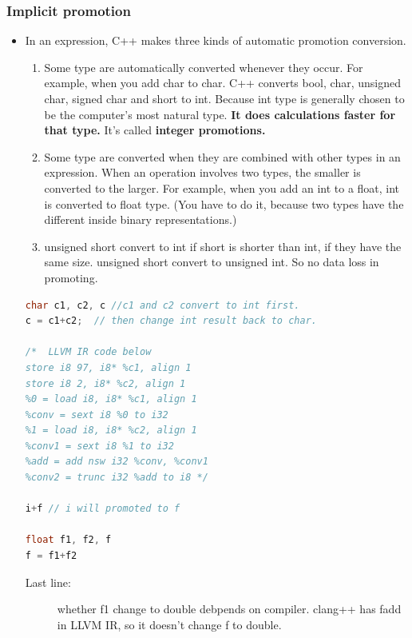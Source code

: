 \documentclass[a4paper,11pt,twoside]{book}
\begin{document}
\subsubsection{Implicit promotion}
\begin{itemize}
\item In an expression, C++ makes three kinds of automatic promotion conversion.
\begin{enumerate}
	\item Some type are automatically converted whenever they occur. For example, when you add char to char. C++ converts bool, char, unsigned char, signed char and short to int. Because int type is generally chosen to be the computer's most natural type. \textbf{It does calculations faster for that type.} It's called \textbf{integer promotions.}
	
	\item Some type are converted when they are combined with other types in an expression. When an operation involves two types, the smaller is converted to the larger. For example, when you add an int to a float, int is converted to float type. (You have to do it, because two types have the different inside binary representations.)
	
	\item unsigned short convert to int if short is shorter than int, if they have the same size. unsigned short convert to unsigned int.  So no data loss in promoting.
\end{enumerate}



\begin{lstlisting}[frame=single, language=c++, mathescape=true]
char c1, c2, c //c1 and c2 convert to int first.
c = c1+c2;  // then change int result back to char.
	
/*  LLVM IR code below
store i8 97, i8* %c1, align 1
store i8 2, i8* %c2, align 1
%0 = load i8, i8* %c1, align 1
%conv = sext i8 %0 to i32
%1 = load i8, i8* %c2, align 1
%conv1 = sext i8 %1 to i32
%add = add nsw i32 %conv, %conv1
%conv2 = trunc i32 %add to i8 */
	
i+f // i will promoted to f
	
float f1, f2, f
f = f1+f2 
\end{lstlisting}
\begin{description}
	\item[Last line:] whether f1 change to double debpends on compiler. clang++ has fadd in LLVM IR, so it doesn't change f to double.
\end{description}
\end{itemize}
\end{document}
